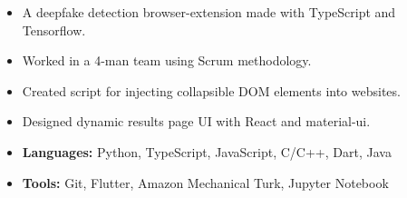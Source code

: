 
\begin{itemize}
\item A deepfake detection browser-extension made with TypeScript and Tensorflow.
\item Worked in a 4-man team using Scrum methodology.
\item Created script for injecting collapsible DOM elements into websites.
\item Designed dynamic results page UI with React and material-ui.
\end{itemize}





\begin{itemize}
    \item \textbf{Languages:} Python, TypeScript, JavaScript, C/C++, Dart, Java
    \item \textbf{Tools:} Git, Flutter, Amazon Mechanical Turk, Jupyter Notebook
\end{itemize}